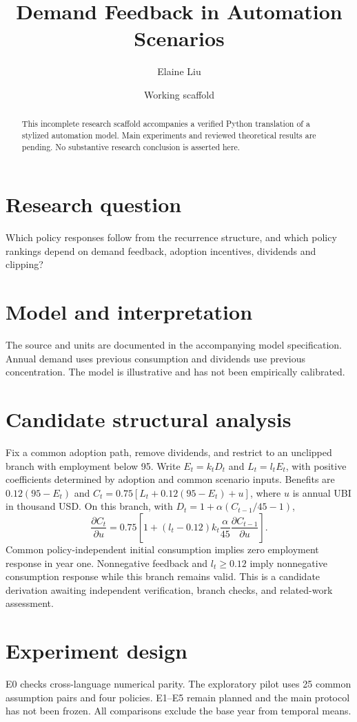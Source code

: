 \documentclass[11pt]{article}
\title{Demand Feedback in Automation Scenarios}
\author{Elaine Liu}
\date{Working scaffold}
\begin{document}
\maketitle
\begin{abstract}
This incomplete research scaffold accompanies a verified Python translation of a
stylized automation model. Main experiments and reviewed theoretical results are
pending. No substantive research conclusion is asserted here.
\end{abstract}
\section{Research question}
Which policy responses follow from the recurrence structure, and which policy
rankings depend on demand feedback, adoption incentives, dividends and clipping?
\section{Model and interpretation}
The source and units are documented in the accompanying model specification.
Annual demand uses previous consumption and dividends use previous concentration.
The model is illustrative and has not been empirically calibrated.
\section{Candidate structural analysis}
Fix a common adoption path, remove dividends, and restrict to an unclipped branch
with employment below 95. Write $E_t=k_tD_t$ and $L_t=l_tE_t$, with positive
coefficients determined by adoption and common scenario inputs. Benefits are
$0.12(95-E_t)$ and $C_t=0.75[L_t+0.12(95-E_t)+u]$, where $u$ is annual UBI in
thousand USD. On this branch, with $D_t=1+\alpha(C_{t-1}/45-1)$,
\[
\frac{\partial C_t}{\partial u}=0.75\left[1+(l_t-0.12)k_t\frac{\alpha}{45}
\frac{\partial C_{t-1}}{\partial u}\right].
\]
Common policy-independent initial consumption implies zero employment response
in year one. Nonnegative feedback and $l_t\geq0.12$ imply nonnegative consumption
response while this branch remains valid. This is a candidate derivation awaiting
independent verification, branch checks, and related-work assessment.
\section{Experiment design}
E0 checks cross-language numerical parity. The exploratory pilot uses 25 common
assumption pairs and four policies. E1--E5 remain planned and the main protocol
has not been frozen. All comparisons exclude the base year from temporal means.
\end{document}
